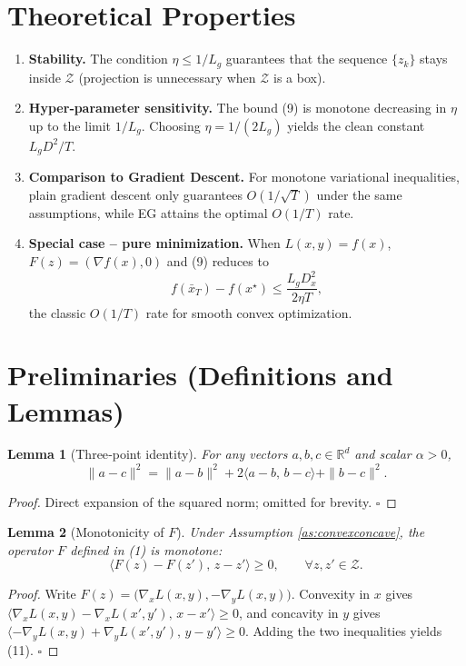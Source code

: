 \documentclass{article}
\newtheorem{lemma}{Lemma}
\newcommand{\R}{\mathbb{R}}
\begin{document}
\section*{Theoretical Properties}
\begin{enumerate}[label=\arabic*.]
\item \textbf{Stability.} The condition $\eta\le 1/L_{g}$ guarantees that the sequence $\{z_{k}\}$ stays inside $\mathcal{Z}$ (projection is unnecessary when $\mathcal{Z}$ is a box).
\item \textbf{Hyper‑parameter sensitivity.} The bound (9) is monotone decreasing in $\eta$ up to the limit $1/L_{g}$. Choosing $\eta=1/(2L_{g})$ yields the clean constant $L_{g}D^{2}/T$.
\item \textbf{Comparison to Gradient Descent.} For monotone variational inequalities, plain gradient descent only guarantees $O(1/\sqrt{T})$ under the same assumptions, while EG attains the optimal $O(1/T)$ rate.
\item \textbf{Special case – pure minimization.} When $L(x,y)=f(x)$, $F(z)=(\nabla f(x),0)$ and (9) reduces to
\[
f(\bar x_{T})-f(x^{\star})\le \frac{L_{g}D_{x}^{2}}{2\eta T},
\]
the classic $O(1/T)$ rate for smooth convex optimization.
\end{enumerate}

\section*{Preliminaries (Definitions and Lemmas)}
\begin{lemma}[Three‑point identity]\label{lem:three}
For any vectors $a,b,c\in\R^{d}$ and scalar $\alpha>0$,
\[
\|a-c\|^{2}= \|a-b\|^{2}+2\langle a-b,\,b-c\rangle+\|b-c\|^{2}.
\tag{10}
\]
\end{lemma}
\begin{proof}
Direct expansion of the squared norm; omitted for brevity. \hfill $\square$
\end{proof}

\begin{lemma}[Monotonicity of $F$]\label{lem:mono}
Under Assumption \ref{as:convexconcave}, the operator $F$ defined in (1) is monotone:
\[
\langle F(z)-F(z'),\,z-z'\rangle\ge0,\qquad\forall z,z'\in\mathcal{Z}.
\tag{11}
\]
\end{lemma}
\begin{proof}
Write $F(z)=\bigl(\nabla_{x}L(x,y),-\nabla_{y}L(x,y)\bigr)$.  
Convexity in $x$ gives $\langle\nabla_{x}L(x,y)-\nabla_{x}L(x',y'),\,x-x'\rangle\ge0$, and concavity in $y$ gives $\langle-\nabla_{y}L(x,y)+\nabla_{y}L(x',y'),\,y-y'\rangle\ge0$. Adding the two inequalities yields (11). \hfill $\square$
\end{proof}
\end{document}
